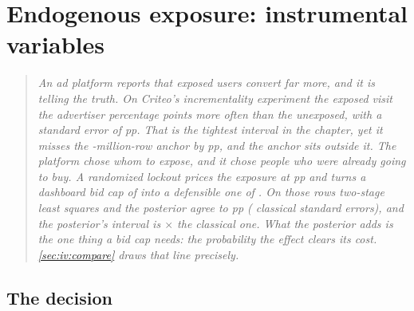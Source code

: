 %
\chapter{Endogenous exposure: instrumental variables}
\label{ch:iv}

\begin{quote}\small
\emph{An ad platform reports that exposed users convert far more, and it is telling the truth. On
Criteo's incrementality experiment the exposed visit the advertiser \nbElevenBNaive{} percentage
points more often than the unexposed, with a standard error of \nbElevenBNaiveSe{} pp. That is the
tightest interval in the chapter, yet it misses the \nbElevenBNFullM-million-row anchor by
\nbElevenBNaiveErr{} pp, and the anchor sits outside it. The platform chose whom to expose, and it
chose people who were already going to buy. A randomized lockout prices the exposure at
\nbElevenBAnchorWald{} pp and turns a dashboard bid cap of \eur{\nbElevenBFullNaiveCap} into a
defensible one of \eur{\nbElevenBCap}. On those rows two-stage least squares and the posterior agree
to \nbElevenBAgreePp{} pp (\nbElevenBAgreeSes{} classical standard errors), and the posterior's
interval is \nbElevenBWidthRatio$\times$ the classical one. What the posterior adds is the one thing
a bid cap needs: the probability the effect clears its cost. \cref{sec:iv:compare} draws that line
precisely.}
\end{quote}

\section{The decision}
\label{sec:iv:decision}

